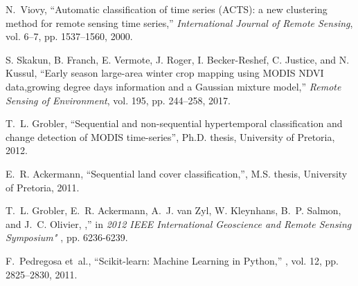 \documentclass{article}
\begin{document}

%
\begin{thebibliography}{1}

N.~Viovy, ``{Automatic classification of time series (ACTS): a new clustering
  method for remote sensing time series,}'' {\em International Journal of Remote Sensing}, vol. 6--7, pp. 1537--1560, 2000.

S. Skakun, B. Franch, E. Vermote, J. Roger, I.
  Becker-Reshef, C. Justice, and N. Kussul, ``Early season large-area winter crop mapping using MODIS NDVI data,growing degree days information and a Gaussian mixture model,'' {\em Remote Sensing of Environment}, vol. 195, pp. 244--258, 2017.
  
T.~L. Grobler, ``Sequential and non-sequential hypertemporal classification and change detection of MODIS time-series'', Ph.D. thesis, University of Pretoria, 2012.

E.~R. Ackermann, ``Sequential land cover classification,'', M.S. thesis, University of Pretoria, 2011.

T.~L. Grobler, E.~R. Ackermann, A.~J. van Zyl, W. Kleynhans,
  B.~P. Salmon, and J.~C. Olivier,
\newblock ,''
\newblock in {\em {2012 IEEE International Geoscience and Remote Sensing
  Symposium" }}, pp. 6236-6239.

F.~Pedregosa et~al.,
\newblock ``{Scikit-learn: Machine Learning in {P}ython},''
, vol. 12, pp. 2825--2830,
  2011.

\end{thebibliography}
\end{document}
